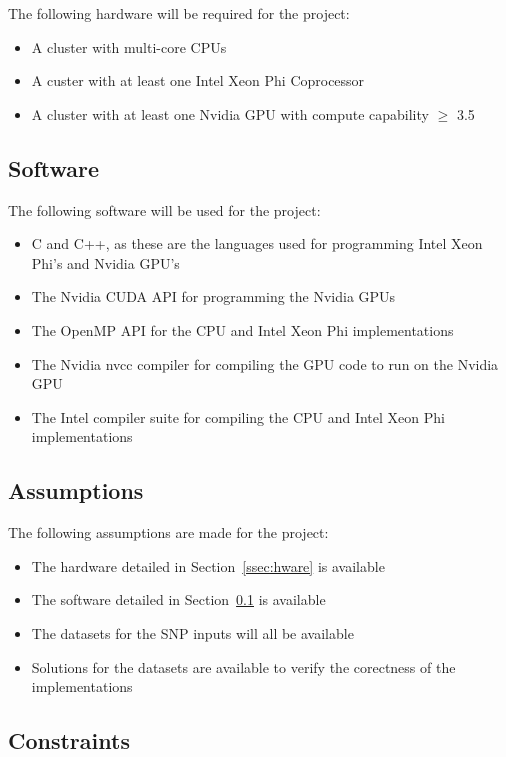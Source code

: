 \documentclass[10pt,a4paer,twocolumn]{article}
\begin{document}
The following hardware will be required for the project:
\begin{itemize}[noitemsep]
    \item{A cluster with multi-core CPUs}
    \item{A custer with at least one Intel Xeon Phi Coprocessor}
    \item{A cluster with at least one Nvidia GPU with compute capability $\ge$ 3.5}
\end{itemize}

\subsection{Software} \label{ssec:sware}

The following software will be used for the project:
\begin{itemize}[noitemsep]
    \item{C and C++, as these are the languages used for programming Intel Xeon Phi's and Nvidia GPU's}
    \item{The Nvidia CUDA API for programming the Nvidia GPUs}
    \item{The OpenMP API for the CPU and Intel Xeon Phi implementations}
    \item{The Nvidia nvcc compiler for compiling the GPU code to run on the Nvidia GPU}
    \item{The Intel compiler suite for compiling the CPU and Intel Xeon Phi implementations}
\end{itemize}

\subsection{Assumptions}

The following assumptions are made for the project:
\begin{itemize}[noitemsep]
    \item{The hardware detailed in Section~\ref{ssec:hware} is available}
    \item{The software detailed in Section~\ref{ssec:sware} is available}
    \item{The datasets for the SNP inputs will all be available}
    \item{Solutions for the datasets are available to verify the corectness of the implementations}
\end{itemize}

\subsection{Constraints}
\end{document}
